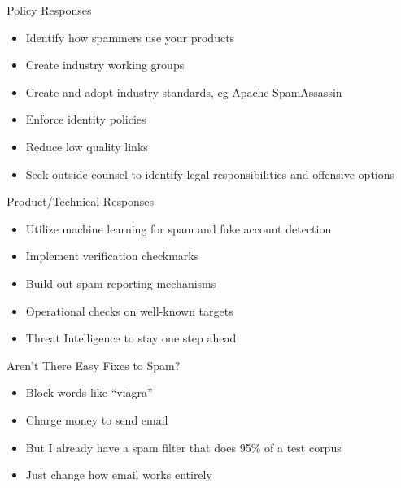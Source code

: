 \documentclass[nobackground,dvipsnames,table,aspectratio=169]{beamer}
\begin{document}
\begin{frame}{Policy Responses}
    \begin{itemize}
        \item Identify how spammers use your products
        \item Create industry working groups
        \item Create and adopt industry standards, eg Apache SpamAssassin
        \item Enforce identity policies
        \item Reduce low quality links
        \item Seek outside counsel to identify legal responsibilities and offensive options
    \end{itemize}
\end{frame}

\begin{frame}{Product/Technical Responses}
    \begin{itemize}
        \item Utilize machine learning for spam and fake account detection
        \item Implement verification checkmarks
        \item Build out spam reporting mechanisms
        \item Operational checks on well-known targets
        \item Threat Intelligence to stay one step ahead
    \end{itemize}
\end{frame}

\begin{frame}{Aren’t There Easy Fixes to Spam?}
    \begin{itemize}
        \item Block words like “viagra”
        \item Charge money to send email
        \item But I already have a spam filter that does 95\% of a test corpus
        \item Just change how email works entirely
    \end{itemize}
\end{frame}
\end{document}
